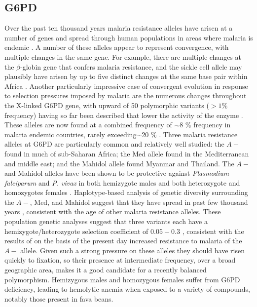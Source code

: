 \documentclass{article}
\begin{document}
\subsection{G6PD}

Over the past ten thousand years malaria resistance alleles have arisen at a number
of genes and spread through human populations in areas where malaria is endemic \citep{Kwiatkowski:05}. 
A number of these alleles appear to represent convergence, with
multiple changes in the same gene. 
For example, there are multiple
changes at the $\beta$-globin gene that confers malaria resistance,
and the sickle cell allele may plausibly have arisen by up to five distinct
changes at the same base pair within Africa
\citep{Flint:98,ralph2010parallel}.
Another particularly impressive case of convergent evolution in response to
selection pressures imposed by malaria are the numerous changes throughout the
X-linked G6PD gene, with upward of 50 polymorphic variants ($>1\%$ frequency) having so far been
described that lower the activity of the enzyme \citep{Howes-g6pd-variants,Minucci-g6pd}. These alleles are now
found at a combined frequency of $\sim$8 \% frequency in malaria endemic countries, rarely
exceeding$\sim$20 \% \citep{Howes-g6pd-preval}. Three malaria
resistance alleles at G6PD are particularly common and relatively well
studied: the $A-$ found in
much of sub-Saharan Africa; the Med allele found in the Mediterranean and middle
east; and the Mahidol allele found Myanmar and Thailand.
The $A-$ and Mahidol alleles have been shown
to be protective against {\it Plasmodium falciparum} and {\it P. vivax} in both
hemizygote males and both heterozygote and homozygotes females \citep{Ruwende-g6pd ,
Louicharoen-g6pd}. Haplotype-based analysis of genetic diversity surrounding
the $A-$, Med, and Mahidol suggest that they have spread in past few
thousand years \citet{tishkoff-g6pd, Slatkin-age-est,Saunders-g6pd,Louicharoen-g6pd}, 
consistent with the age of other malaria resistance alleles. 
These population genetic analyses suggest that three variants each have a hemizygote/heterozygote 
selection coefficient of $0.05-0.3$ \citep{tishkoff-g6pd
  Slatkin-age-est,Saunders-g6pd,Louicharoen-g6pd}, consistent with
the results of \citet{Ruwende-g6pd} on the basis of the present day increased resistance to malaria of the
$A-$ allele. 
Given such a strong pressure on these alleles they should have risen
quickly to fixation, so their presence at intermediate frequency,
over a broad geographic area, makes it a good candidate for a recently
balanced polymorphism. 
Hemizygous males and homozygous females suffer from G6PD deficiency,
leading to hemolytic anemia when exposed to a variety of compounds, notably
those present in fava beans. 
\end{document}
